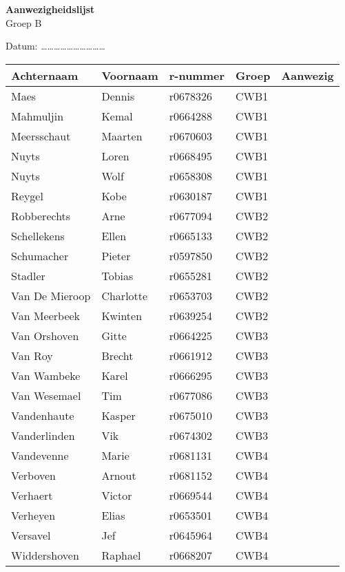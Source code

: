 \documentclass[12pt,a4paper]{article}
\begin{document}
\pagestyle{empty}

\begin{center}
	\begin{Large}
		\textbf{Aanwezigheidslijst}\\[0.5cm]%
		Groep B
	\end{Large}
	
	\vspace*{1cm}
	
	Datum: \ldots\ldots\ldots\ldots\ldots\ldots\ldots\ldots\ldots\ldots
\end{center}

\begin{table}[!h]
\centering
\begin{tabular}{m{3cm}m{2.5cm}m{2cm}m{2cm}m{3cm}}
\toprule[1pt]
\textbf{Achternaam} & \textbf{Voornaam} & \textbf{r-nummer} & \textbf{Groep} & \textbf{Aanwezig} \\
\midrule[1pt]
Maes & Dennis & r0678326 & CWB1 \\
\midrule
Mahmuljin & Kemal & r0664288& CWB1 \\
\midrule
Meersschaut & Maarten & r0670603& CWB1 \\
\midrule
Nuyts & Loren & r0668495& CWB1 \\
\midrule
Nuyts & Wolf & r0658308& CWB1 \\
\midrule
Reygel & Kobe & r0630187& CWB1 \\
\midrule[1pt]
Robberechts & Arne & r0677094& CWB2\\
\midrule
Schellekens & Ellen & r0665133& CWB2\\
\midrule
Schumacher & Pieter & r0597850& CWB2\\
\midrule
Stadler & Tobias & r0655281& CWB2\\
\midrule
Van De Mieroop & Charlotte & r0653703& CWB2\\
\midrule
Van Meerbeek & Kwinten & r0639254& CWB2\\
\midrule[1pt]
Van Orshoven & Gitte & r0664225& CWB3\\
\midrule
Van Roy & Brecht & r0661912& CWB3\\
\midrule
Van Wambeke & Karel & r0666295& CWB3\\
\midrule
Van Wesemael & Tim & r0677086& CWB3\\
\midrule
Vandenhaute & Kasper & r0675010& CWB3\\
\midrule
Vanderlinden & Vik & r0674302& CWB3\\
\midrule[1pt]
Vandevenne & Marie & r0681131& CWB4\\
\midrule
Verboven & Arnout & r0681152& CWB4\\
\midrule
Verhaert & Victor & r0669544& CWB4\\
\midrule
Verheyen & Elias & r0653501& CWB4\\
\midrule
Versavel & Jef & r0645964& CWB4\\
\midrule
Widdershoven & Raphael & r0668207& CWB4\\
\bottomrule[1pt]
\end{tabular}
\end{table}
\end{document}
